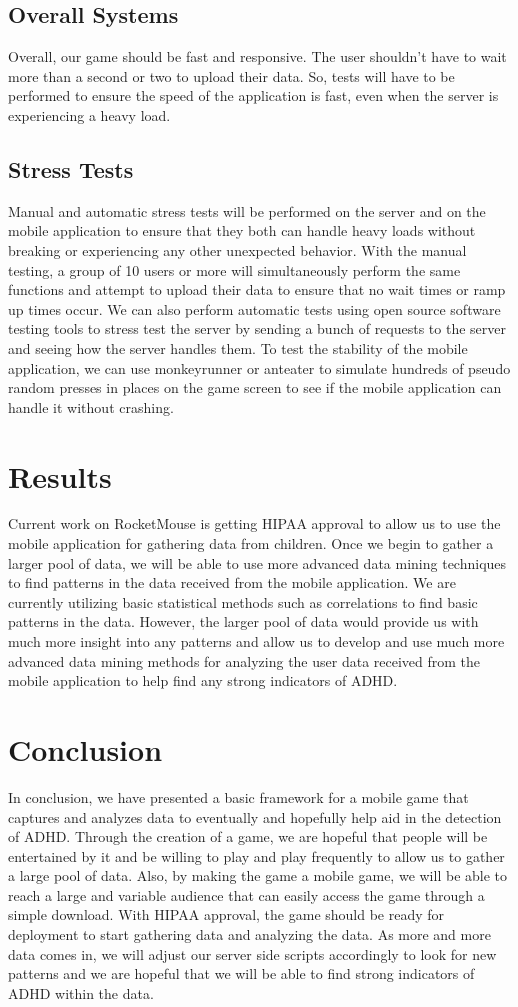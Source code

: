\documentclass[a4wide]{article}
\begin{document}
\subsection{Overall Systems}
\-Overall, our game should be fast and responsive. The user shouldn't have to wait more than a second or two to upload their data. So, tests will have to be performed to ensure the speed of the application is fast, even when the server is experiencing a heavy load.
\subsection{Stress Tests}
\-Manual and automatic stress tests will be performed on the server and on the mobile application to ensure that they both can handle heavy loads without breaking or experiencing any other unexpected behavior. With the manual testing, a group of 10 users or more will simultaneously perform the same functions and attempt to upload their data to ensure that no wait times or ramp up times occur. We can also perform automatic tests using open source software testing tools to stress test the server by sending a bunch of requests to the server and seeing how the server handles them. To test the stability of the mobile application, we can use monkeyrunner or anteater to simulate hundreds of pseudo random presses in places on the game screen to see if the mobile application can handle it without crashing.

\section{Results}
Current work on RocketMouse is getting HIPAA approval to allow us to use the mobile application for gathering data from children. Once we begin to gather a larger pool of data, we will be able to use more advanced data mining techniques to find patterns in the data received from the mobile application. We are currently utilizing basic statistical methods such as correlations to find basic patterns in the data. However, the larger pool of data would provide us with much more insight into any patterns and allow us to develop and use much more advanced data mining methods for analyzing the user data received from the mobile application to help find any strong indicators of ADHD.
\section{Conclusion}
In conclusion, we have presented a basic framework for a mobile game that captures and analyzes data to eventually and hopefully help aid in the detection of ADHD. Through the creation of a game, we are hopeful that people will be entertained by it and be willing to play and play frequently to allow us to gather a large pool of data. Also, by making the game a mobile game, we will be able to reach a large and variable audience that can easily access the game through a simple download. With HIPAA approval, the game should be ready for deployment to start gathering data and analyzing the data. As more and more data comes in, we will adjust our server side scripts accordingly to look for new patterns and we are hopeful that we will be able to find strong indicators of ADHD within the data.


\end{document}
